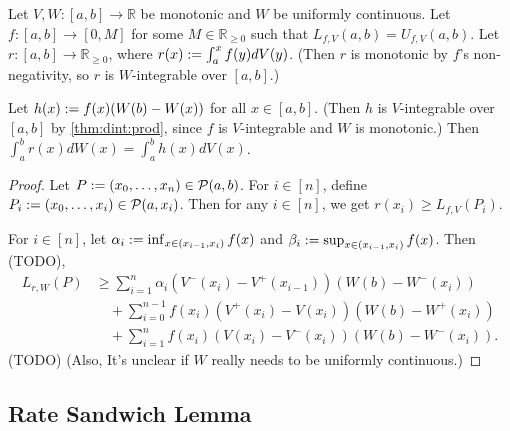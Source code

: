 \documentclass[a4paper,12pt,fleqn]{article}
\begin{document}
\begin{lemma}
Let $V, W: [a, b] \to \mathbb{R}$ be monotonic and $W$ be uniformly continuous.
Let $f: [a, b] \to [0, M]$ for some $M \in \mathbb{R}_{\ge 0}$
such that $L_{f,V}(a, b) = U_{f,V}(a, b)$.
Let $r: [a, b] \to \mathbb{R}_{\ge 0}$, where
$r(x) := \int_a^x f(y)dV(y)$.
(Then $r$ is monotonic by $f$'s non-negativity,
so $r$ is $W$-integrable over $[a, b]$.)

Let $h(x) := f(x)(W(b)-W(x))$ for all $x \in [a, b]$.
(Then $h$ is $V$-integrable over $[a, b]$ by \cref{thm:dint:prod},
since $f$ is $V$-integrable and $W$ is monotonic.)
Then $\int_a^b r(x)dW(x) = \int_a^b h(x)dV(x)$.
\end{lemma}
\begin{proof}
Let $P := (x_0, \ldots, x_n) \in \mathcal{P}(a, b)$.
For $i \in [n]$, define $P_i := (x_0, \ldots, x_i) \in \mathcal{P}(a, x_i)$.
Then for any $i \in [n]$, we get $r(x_i) \ge L_{f,V}(P_i)$.

For $i \in [n]$, let $\alpha_i := \inf_{x \in (x_{i-1}, x_i)} f(x)$
and $\beta_i := \sup_{x \in (x_{i-1}, x_i)} f(x)$.
%
Then (TODO),
\begin{align*}
L_{r,W}(P) &\ge \sum_{i=1}^n \alpha_i(V^-(x_i)-V^+(x_{i-1}))(W(b)-W^-(x_i))
    \\ &\quad + \sum_{i=0}^{n-1} f(x_i)(V^+(x_i)-V(x_i))(W(b)-W^+(x_i))
    \\ &\quad + \sum_{i=1}^n f(x_i)(V(x_i)-V^-(x_i))(W(b)-W^-(x_i)).
\end{align*}
(TODO)
(Also, It's unclear if $W$ really needs to be uniformly continuous.)
\end{proof}

\subsection{Rate Sandwich Lemma}
\end{document}
